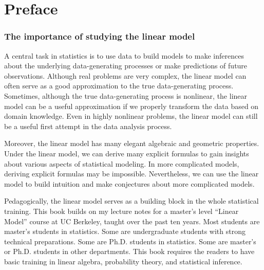 \chapter*{Preface}


%
%



\subsection*{The importance of studying the linear model}


A central task in statistics is to use data to build models to make inferences about the underlying data-generating processes or make predictions of future observations. Although real problems are very complex, the linear model can often serve as a good approximation to the true data-generating process. Sometimes, although the true data-generating process is nonlinear, the linear model can be a useful approximation if we properly transform the data based on domain knowledge. Even in highly nonlinear problems, the linear model can still be a useful first attempt in the data analysis process. 



Moreover, the linear model has many elegant algebraic and geometric properties. Under the linear model, we can derive many explicit formulas to gain insights about various aspects of statistical modeling. In more complicated models, deriving explicit formulas may be impossible. Nevertheless, we can use the linear model to build intuition and make conjectures about more complicated models. 


Pedagogically, the linear model serves as a building block in the whole statistical training. This book builds on my lecture notes for a master's level ``Linear Model'' course at UC Berkeley, taught over the past ten years. Most students are master's students in statistics. Some are undergraduate students with strong technical preparations. Some are Ph.D. students in statistics. Some are master's or Ph.D. students in other departments. This book requires the readers to have basic training in linear algebra, probability theory, and statistical inference. 
 
